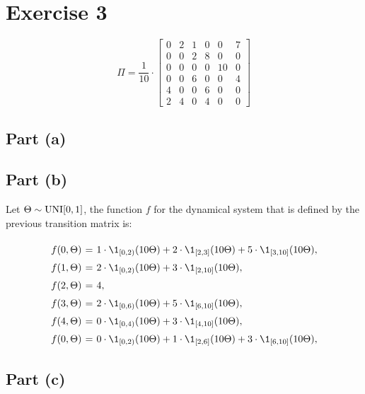 \section{Exercise 3}

\[ \Pi = \frac{1}{10}\cdot \left[
\begin{array}{cccccc}
    0 & 2 & 1 & 0 & 0 & 7\\
    0 & 0 & 2 & 8 & 0 & 0\\
    0 & 0 & 0 & 0 & 10& 0\\
    0 & 0 & 6 & 0 & 0 & 4\\
    4 & 0 & 0 & 6 & 0 & 0\\
    2 & 4 & 0 & 4 & 0 & 0
\end{array}
\right] \]

\subsection*{Part (a)}

\begin{figure}[H]
    \centering
    
\end{figure}

\subsection*{Part (b)}

Let $\Theta \sim \hbox{UNI}[0,1]$, the function $f$ for the dynamical system that is defined by the previous transition matrix is:

\[ \everymath{\displaystyle}
\arraycolsep=1.8pt\def\arraystretch{1.5}
\begin{array}{rcl}
    f(0,\Theta) & = & 1\cdot \1_{[0,2)}(10\Theta) + 2\cdot\1_{[2,3]}(10\Theta) + 5\cdot\1_{[3,10]}(10\Theta),\\
    f(1,\Theta) & = & 2\cdot \1_{[0,2)}(10\Theta) + 3\cdot\1_{[2,10]}(10\Theta),\\
    f(2,\Theta) & = & 4, \\
    f(3,\Theta) & = & 2\cdot \1_{[0,6)}(10\Theta) + 5\cdot\1_{[6,10]}(10\Theta),\\
    f(4,\Theta) & = & 0\cdot \1_{[0,4)}(10\Theta) + 3\cdot\1_{[4,10]}(10\Theta),\\
    f(0,\Theta) & = & 0\cdot \1_{[0,2)}(10\Theta) + 1\cdot\1_{[2,6]}(10\Theta) + 3\cdot\1_{[6,10]}(10\Theta),
\end{array} \]

\subsection*{Part (c)}

